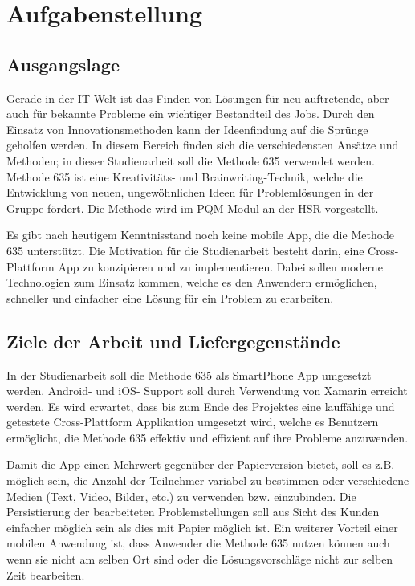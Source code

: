 \section{Aufgabenstellung}
\label{Aufgabenstellung}
%

\subsection{Ausgangslage}
Gerade in der IT-Welt ist das Finden von Lösungen für neu auftretende, aber auch für bekannte Probleme ein wichtiger Bestandteil des Jobs. Durch den Einsatz von Innovationsmethoden kann der Ideenfindung auf die Sprünge geholfen werden. In diesem Bereich finden sich die verschiedensten Ansätze und Methoden; in dieser Studienarbeit soll die Methode 635 \cite{methode-635} verwendet werden. Methode 635 ist eine Kreativitäts- und Brainwriting-Technik, welche die Entwicklung von neuen, ungewöhnlichen Ideen für Problemlösungen in der Gruppe fördert. Die Methode wird im PQM-Modul an der HSR vorgestellt.
 
Es gibt nach heutigem Kenntnisstand noch keine mobile App, die die Methode 635 unterstützt. Die Motivation für die Studienarbeit besteht darin, eine Cross-Plattform App zu konzipieren und zu implementieren. Dabei sollen moderne Technologien zum Einsatz kommen, welche es den Anwendern ermöglichen, schneller und einfacher eine Lösung für ein Problem zu erarbeiten.

\subsection{Ziele der Arbeit und Liefergegenstände}\label{subsec:ziele}
In der Studienarbeit soll die Methode 635 als SmartPhone App umgesetzt werden. Android- und iOS- Support soll durch Verwendung von Xamarin erreicht werden.
Es wird erwartet, dass bis zum Ende des Projektes eine lauffähige und getestete Cross-Plattform Applikation umgesetzt wird, welche es Benutzern ermöglicht, die Methode 635 effektiv und effizient auf ihre Probleme anzuwenden. 

Damit die App einen Mehrwert gegenüber der Papierversion bietet, soll es z.B. möglich sein, die Anzahl der Teilnehmer variabel zu bestimmen oder verschiedene Medien (Text, Video, Bilder, etc.) zu verwenden bzw. einzubinden. Die Persistierung der bearbeiteten Problemstellungen soll aus Sicht des Kunden einfacher möglich sein als dies mit Papier möglich ist. Ein weiterer Vorteil einer mobilen Anwendung ist, dass Anwender die Methode 635 nutzen können auch wenn sie nicht am selben Ort sind oder die Lösungsvorschläge nicht zur selben Zeit bearbeiten. 

